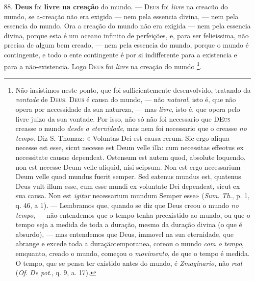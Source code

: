  88. \textbf{Deus} foi \textbf{livre na creação} do mundo. --- \textsc{Deus} foi \emph{livre} na creacüo do mundo, se a-creação não era exigida --- nem pela essencia divina, --- nem pela essencia do mundo. Ora a creação do mundo não era exigida --- nem pela essencia divina, porque esta é um oceano infinito de perfeições, e, para ser felieissima, não precisa de algum bem creado, --- nem pela essencia do mundo, porque o mundo é contingente, e todo o ente contingente é por si indifferente para a existencia e para a não-existencia. Logo \textsc{Deus} foi \emph{livre} na creação do mundo \footnote{Não insistimos neste ponto, que foi sufficientemente desenvolvido, tratando da \emph{vontade} de \textsc{Deus}. \textsc{Deus} é causa do mundo, --- não \emph{natural}, isto é, que não opera por necessidade da sua natureza, --- mas \emph{livre}, isto é, que opera pelo livre juizo da sua vontade. Por isso, não só não foi necessario que \textsc{DEus} creasse o mundo \emph{desde a eternidade}, mas nem foi necessario que o creasse \emph{no tempo}. Diz S. Thomaz: « Voluntas Dei est causa rerum. Sic ergo aliqua necesse est esse, sicut necesse est Deum velle illa: cum necessitas effeotus ex necessitate causae dependeat. Ostensum est autem quod, absolute loquendo, non est necesse Deum velle aliquid, nisi seipsum. Non est ergo necessarium Deum velle quod mundus fuerit semper. Sed eatenus mundus est, quatenus Deus vult illum esse, cum esse mundi ex voluntate Dei dependeat, sicut ex sua causa. Non est \emph{igitur} necessarium mundum Semper esse» (\emph{Sum}. \emph{Th}., p. 1, q. 46, a 1). --- Lembramos que, quando se diz que Deus creou o mundo \emph{no tempo}, --- não entendemos que o tempo tenha preexistido ao mundo, ou que o tempo seja a medida de toda a duração, mesmo da duração divina (o que é absurdo), --- mas entendemos que Deus, immovel na sua eternidade, que abrange e excede toda a duraçãotemporanea, coreou o mundo \emph{com o tempo}, emquanto, creado o mundo, começou o \emph{movimento}, de que o tempo é medida. O tempo, que se pensa ter existido antes do mundo, é \emph{Zmaginario}, não \emph{real} (\emph{Of}. \emph{De pot}., q. 9, a. 17).}.

